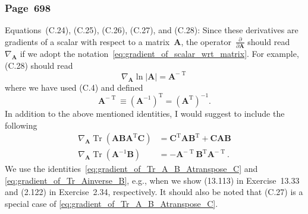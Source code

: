 \documentclass[12pt,a4paper]{article}
\newcommand{\erratum}[1]{\subsubsection*{#1}}
\begin{document}
\erratum{Page~698}
Equations~(C.24), (C.25), (C.26), (C.27), and (C.28):
Since these derivatives are gradients of a scalar with respect to a matrix~$\mathbf{A}$,
the operator~$\frac{\partial}{\partial \mathbf{A}}$ should
read $\nabla_{\mathbf{A}}$ if we adopt the notation~\eqref{eq:gradient_of_scalar_wrt_matrix}.
For example, (C.28) should read
\begin{equation}
\nabla_{\mathbf{A}} \ln \left| \mathbf{A} \right| = \mathbf{A}^{-\operatorname{T}}
\end{equation}
where we have used (C.4) and defined
\begin{equation}
\mathbf{A}^{-\operatorname{T}} \equiv
\left( \mathbf{A}^{-1}\right )^{\operatorname{T}} =
\left( \mathbf{A}^{\operatorname{T}}\right )^{-1} .
\end{equation}
In addition to the above mentioned identities,
I would suggest to include the following
\begin{align}
\nabla_{\mathbf{A}} \operatorname{Tr}\left(
\mathbf{A}\mathbf{B}\mathbf{A}^{\operatorname{T}}\mathbf{C} \right) &=
\mathbf{C}^{\operatorname{T}} \mathbf{A} \mathbf{B}^{\operatorname{T}} +
\mathbf{C} \mathbf{A} \mathbf{B}
\label{eq:gradient_of_Tr_A_B_Atranspose_C} \\
\nabla_{\mathbf{A}} \operatorname{Tr}\left(\mathbf{A}^{-1}\mathbf{B}\right) &=
- \mathbf{A}^{-\operatorname{T}} \mathbf{B}^{\operatorname{T}} \mathbf{A}^{-\operatorname{T}}.
\label{eq:gradient_of_Tr_Ainverse_B}
\end{align}
We use the identities~\eqref{eq:gradient_of_Tr_A_B_Atranspose_C} and
\eqref{eq:gradient_of_Tr_Ainverse_B}, e.g.,
when we show (13.113) in Exercise~13.33 and (2.122) in Exercise~2.34, respectively.
It should also be noted that (C.27) is a special case of
\eqref{eq:gradient_of_Tr_A_B_Atranspose_C}.
\end{document}
